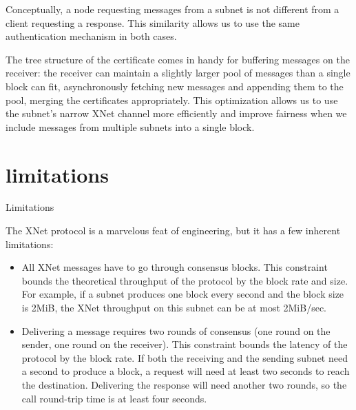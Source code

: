 \documentclass{article}
\begin{document}
Conceptually, a node requesting messages from a subnet is not different from a client requesting a response.
This similarity allows us to use the same authentication mechanism in both cases.

The tree structure of the certificate comes in handy for buffering messages on the receiver: the receiver can maintain a slightly larger pool of messages than a single block can fit, asynchronously fetching new messages and appending them to the pool, merging the certificates appropriately.
This optimization allows us to use the subnet's narrow XNet channel more efficiently and improve fairness when we include messages from multiple subnets into a single block.

\section{limitations}{Limitations}

The XNet protocol is a marvelous feat of engineering, but it has a few inherent limitations:
\begin{itemize}
  \item
    All XNet messages have to go through consensus blocks.
    This constraint bounds the theoretical throughput of the protocol by the block rate and size.
    For example, if a subnet produces one block every second and the block size is 2MiB, the XNet throughput on this subnet can be at most 2MiB/sec.
  \item
    Delivering a message requires two rounds of consensus (one round on the sender, one round on the receiver).
    This constraint bounds the latency of the protocol by the block rate.
    If both the receiving and the sending subnet need a second to produce a block, a request will need at least two seconds to reach the destination.
    Delivering the response will need another two rounds, so the call round-trip time is at least four seconds.
\end{itemize}
\end{document}
